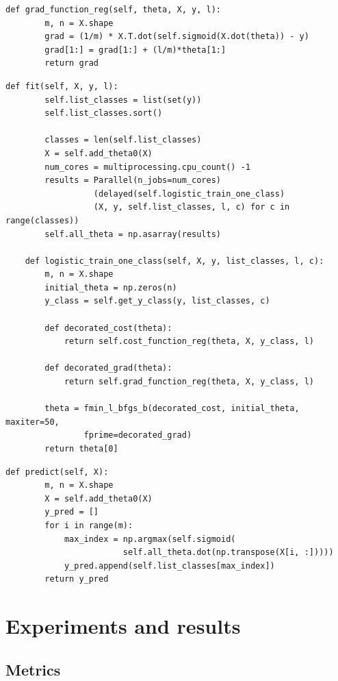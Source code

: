 \documentclass[letterpaper,10pt]{article}
\theoremstyle{mytheor}
\begin{document}
\begin{lstlisting}[label={list:fourth},caption=Gradient Function]
    def grad_function_reg(self, theta, X, y, l):
        m, n = X.shape
        grad = (1/m) * X.T.dot(self.sigmoid(X.dot(theta)) - y)
        grad[1:] = grad[1:] + (l/m)*theta[1:]
        return grad
\end{lstlisting}

\begin{lstlisting}[label={list:fifth},caption=Training Process]
    def fit(self, X, y, l):
        self.list_classes = list(set(y))
        self.list_classes.sort()

        classes = len(self.list_classes)
        X = self.add_theta0(X)
        num_cores = multiprocessing.cpu_count() -1
        results = Parallel(n_jobs=num_cores) 
        		  (delayed(self.logistic_train_one_class)
        		  (X, y, self.list_classes, l, c) for c in range(classes))
        self.all_theta = np.asarray(results)

    def logistic_train_one_class(self, X, y, list_classes, l, c):
        m, n = X.shape
        initial_theta = np.zeros(n)
        y_class = self.get_y_class(y, list_classes, c)

        def decorated_cost(theta):
            return self.cost_function_reg(theta, X, y_class, l)

        def decorated_grad(theta):
            return self.grad_function_reg(theta, X, y_class, l)

        theta = fmin_l_bfgs_b(decorated_cost, initial_theta, maxiter=50, 
                fprime=decorated_grad)
        return theta[0]
\end{lstlisting}

\begin{lstlisting}[label={list:fifth},caption=Prediction Process]
    def predict(self, X):
        m, n = X.shape
        X = self.add_theta0(X)
        y_pred = []
        for i in range(m):
            max_index = np.argmax(self.sigmoid(
            			self.all_theta.dot(np.transpose(X[i, :]))))
            y_pred.append(self.list_classes[max_index])
        return y_pred
\end{lstlisting}

\section{Experiments and results}

\subsection{Metrics}
\end{document}
